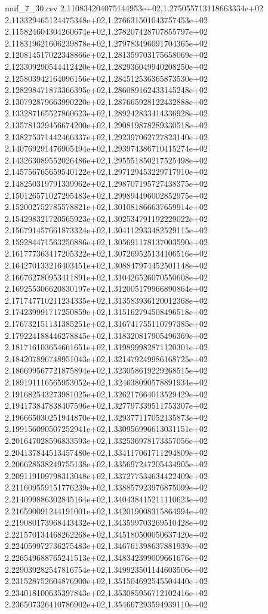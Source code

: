 \begin{filecontents*}{muf_7_30.csv}
2.110834204075144953e+02,1.275055713118663334e+02
2.113329465124475348e+02,1.276631501043757453e+02
2.115824604304260674e+02,1.278207428707855797e+02
2.118319621606239878e+02,1.279783496091704365e+02
2.120814517022348866e+02,1.281359703175658069e+02
2.123309290544412420e+02,1.282936049940208250e+02
2.125803942164096156e+02,1.284512536365873530e+02
2.128298471873366395e+02,1.286089162433145248e+02
2.130792879663990220e+02,1.287665928122432888e+02
2.133287165527860623e+02,1.289242833414336928e+02
2.135781329456674200e+02,1.290819878289330518e+02
2.138275371442466337e+02,1.292397062727823140e+02
2.140769291476905494e+02,1.293974386710415274e+02
2.143263089552026486e+02,1.295551850217525498e+02
2.145756765659540122e+02,1.297129453229717910e+02
2.148250319791339962e+02,1.298707195727438375e+02
2.150126571027295483e+02,1.299894496002852975e+02
2.152002752785578821e+02,1.301081866637659914e+02
2.154298321720565923e+02,1.302534791192229022e+02
2.156791457661873324e+02,1.304112933482529115e+02
2.159284471563256886e+02,1.305691178137003590e+02
2.161777363417205322e+02,1.307269525134106516e+02
2.164270133216403451e+02,1.308847974452501148e+02
2.166762780953411891e+02,1.310426526070550608e+02
2.169255306620830197e+02,1.312005179966890864e+02
2.171747710211234335e+02,1.313583936120012368e+02
2.174239991717250859e+02,1.315162794508496518e+02
2.176732151131385251e+02,1.316741755110797385e+02
2.179224188446278845e+02,1.318320817905496369e+02
2.181716103654661651e+02,1.319899982871120301e+02
2.184207896748951043e+02,1.321479249986168725e+02
2.186699567721875894e+02,1.323058619229268515e+02
2.189191116565953052e+02,1.324638090578891934e+02
2.191682543273981025e+02,1.326217664013529429e+02
2.194173847838407596e+02,1.327797339511753307e+02
2.196665030251944870e+02,1.329377117052135873e+02
2.199156090507252941e+02,1.330956996613031151e+02
2.201647028596833593e+02,1.332536978173357056e+02
2.204137844513457480e+02,1.334117061711294809e+02
2.206628538249755138e+02,1.335697247205434905e+02
2.209119109798313048e+02,1.337277534634422409e+02
2.211609559151776239e+02,1.338857923976875099e+02
2.214099886302845164e+02,1.340438415211110623e+02
2.216590091244191001e+02,1.342019008315864994e+02
2.219080173968443432e+02,1.343599703269510428e+02
2.221570134468262268e+02,1.345180500050637420e+02
2.224059972736275483e+02,1.346761398637881939e+02
2.226549688765241513e+02,1.348342399009661676e+02
2.229039282547816754e+02,1.349923501144603506e+02
2.231528752604876900e+02,1.351504692545504440e+02
2.234018100635397843e+02,1.353085956712102416e+02
2.236507326410786902e+02,1.354667293594939110e+02

\end{filecontents*}
